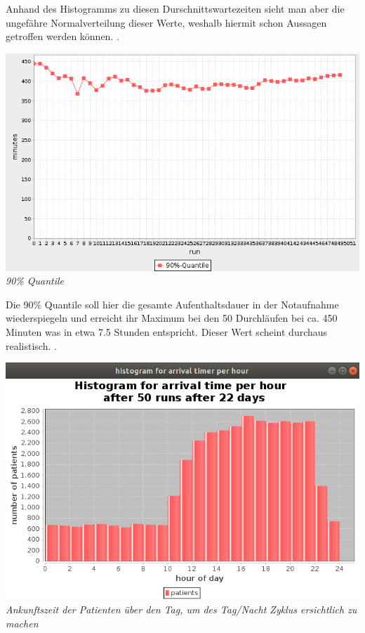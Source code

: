 \documentclass{article}
\begin{document}
Anhand des Histogramms zu diesen Durschnittswartezeiten sieht man aber die ungefähre Normalverteilung dieser Werte, weshalb hiermit schon Aussagen getroffen werden können.
.\\
\begin{center}
\includegraphics[scale=0.4]{img/quantile.png}\\
\textit{90\% Quantile}\\
\end{center}
Die 90\% Quantile soll hier die gesamte Aufenthaltsdauer in der Notaufnahme wiederspiegeln und erreicht ihr Maximum bei den 50 Durchläufen bei ca. 450 Minuten was in etwa 7.5 Stunden entspricht. Dieser Wert scheint durchaus realistisch.
.\\
\begin{center}
\includegraphics[scale=0.4]{img/day_night.png}\\
\textit{Ankunftszeit der Patienten über den Tag, um des Tag/Nacht Zyklus ersichtlich zu machen}
\end{center}
\end{document}
